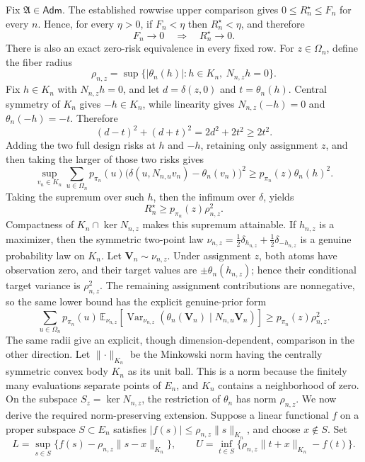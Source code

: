 Fix \(\mathfrak A\in\mathsf{Adm}\). The established rowwise upper comparison gives \(0\le R_n^{\star}\le F_n\) for every \(n\). Hence, for every \(\eta>0\), if \(F_n<\eta\) then \(R_n^{\star}<\eta\), and therefore
\[
 F_n\longrightarrow0\quad\Longrightarrow\quad R_n^{\star}\longrightarrow0.
\]
There is also an exact zero-risk equivalence in every fixed row. For \(z\in\Omega_n\), define the fiber radius
\[
 \rho_{n,z}=\sup\{\lvert\theta_n(h)\rvert:h\in K_n,\ N_{n,z}h=0\}.
\]
Fix \(h\in K_n\) with \(N_{n,z}h=0\), and let \(d=\delta(z,0)\) and \(t=\theta_n(h)\). Central symmetry of \(K_n\) gives \(-h\in K_n\), while linearity gives \(N_{n,z}(-h)=0\) and \(\theta_n(-h)=-t\). Therefore
\[
 (d-t)^2+(d+t)^2=2d^2+2t^2\ge2t^2.
\]
Adding the two full design risks at \(h\) and \(-h\), retaining only assignment \(z\), and then taking the larger of those two risks gives
\[
 \sup_{v_n\in K_n}\sum_{u\in\Omega_n}p_{\pi_n}(u)
 \bigl(\delta(u,N_{n,u}v_n)-\theta_n(v_n)\bigr)^2
 \ge p_{\pi_n}(z)\theta_n(h)^2.
\]
Taking the supremum over such \(h\), then the infimum over \(\delta\), yields
\[
 R_n^{\star}\ge p_{\pi_n}(z)\rho_{n,z}^2.
\]
Compactness of \(K_n\cap\ker N_{n,z}\) makes this supremum attainable. If \(h_{n,z}\) is a maximizer, then the symmetric two-point law \(\nu_{n,z}=\tfrac12\delta_{h_{n,z}}+\tfrac12\delta_{-h_{n,z}}\) is a genuine probability law on \(K_n\). Let \(\mathbf V_n\sim\nu_{n,z}\). Under assignment \(z\), both atoms have observation zero, and their target values are \(\pm\theta_n(h_{n,z})\); hence their conditional target variance is \(\rho_{n,z}^2\). The remaining assignment contributions are nonnegative, so the same lower bound has the explicit genuine-prior form
\[
 \sum_{u\in\Omega_n}p_{\pi_n}(u)\,
 \mathbb E_{\nu_{n,z}}\!\left[\operatorname{Var}_{\nu_{n,z}}\!\left(\theta_n(\mathbf V_n)\mid N_{n,u}\mathbf V_n\right)\right]
 \ge p_{\pi_n}(z)\rho_{n,z}^2.
\]
The same radii give an explicit, though dimension-dependent, comparison in the other direction. Let \(\lVert\cdot\rVert_{K_n}\) be the Minkowski norm having the centrally symmetric convex body \(K_n\) as its unit ball. This is a norm because the finitely many evaluations separate points of \(E_n\), and \(K_n\) contains a neighborhood of zero. On the subspace \(S_z=\ker N_{n,z}\), the restriction of \(\theta_n\) has norm \(\rho_{n,z}\). We now derive the required norm-preserving extension. Suppose a linear functional \(f\) on a proper subspace \(S\subset E_n\) satisfies \(\lvert f(s)\rvert\le\rho_{n,z}\lVert s\rVert_{K_n}\), and choose \(x\notin S\). Set
\[
 L=\sup_{s\in S}\{f(s)-\rho_{n,z}\lVert s-x\rVert_{K_n}\},\qquad
 U=\inf_{t\in S}\{\rho_{n,z}\lVert t+x\rVert_{K_n}-f(t)\}.
\]

